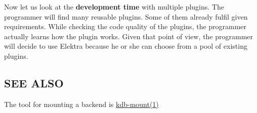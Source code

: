 Now let us look at the {\bfseries development time} with multiple plugins. The programmer will find many reusable plugins. Some of them already fulfil given requirements. While checking the code quality of the plugins, the programmer actually learns how the plugin works. Given that point of view, the programmer will decide to use Elektra because he or she can choose from a pool of existing plugins.

\subsection*{S\+EE A\+L\+SO}


\begin{DoxyItemize}
\item The tool for mounting a backend is \hyperlink{md_doc_help_kdb-mount_doc_help_kdb-mount_md}{kdb-\/mount(1)} 
\end{DoxyItemize}